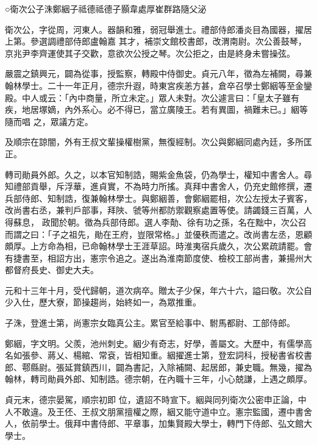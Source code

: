 
\begin{pinyinscope}

 ○衛次公子洙鄭絪子祗德祗德子顥韋處厚崔群路隨父泌



 衛次公，字從周，河東人。器韻和雅，弱冠舉進士。禮部侍郎潘炎目為國器，擢居上第。參選調禮部侍郎盧翰嘉
 其才，補崇文館校書郎，改渭南尉。次公善鼓琴，京兆尹李齊運使其子交歡，意欲次公授之琴。次公拒之，由是終身未嘗操弦。



 嚴震之鎮興元，闢為從事，授監察，轉殿中侍御史。貞元八年，徵為左補闕，尋兼翰林學士。二十一年正月，德宗升遐，時東宮疾恙方甚，倉卒召學士鄭絪等至金鑾殿。中人或云：「內中商量，所立未定。」眾人未對。次公遽言曰：「皇太子雖有疾，地居塚嫡，內外系心。必不得已，當立廣陵王。若有異圖，禍難未已。」絪等隨而唱
 之，眾議方定。



 及順宗在諒闇，外有王叔文輩操權樹黨，無復經制。次公與鄭絪同處內廷，多所匡正。



 轉司勛員外郎。久之，以本官知制誥，賜紫金魚袋，仍為學士，權知中書舍人。尋知禮部貢舉，斥浮華，進貞實，不為時力所搖。真拜中書舍人，仍充史館修撰，遷兵部侍郎、知制誥，復兼翰林學士。與鄭絪善，會鄭絪罷相，次公左授太子賓客，改尚書右丞，兼判戶部事，拜陜、虢等州都防禦觀察處置等使。請蠲錢三百萬，人得蘇息，
 政聞於朝。徵為兵部侍郎。選人李勣、徐有功之孫，名在黜中，次公召而謂之曰：「子之祖先，勛在王府，豈限常格。」並優秩而遣之。改尚書左丞，恩顧頗厚。上方命為相，已命翰林學士王涯草詔。時淮夷宿兵歲久，次公累疏請罷。會有捷書至，相詔方出，憲宗令追之。遂出為淮南節度使、檢校工部尚書，兼揚州大都督府長史、御史大夫。



 元和十三年十月，受代歸朝，道次病卒。贈太子少保，年六十六，謚曰敬。次公自少入仕，歷大寮，節操趨尚，始終如一，為眾推重。



 子洙，登進士第，尚憲宗女臨真公主。累官至給事中、駙馬都尉、工部侍郎。



 鄭絪，字文明。父羨，池州刺史。絪少有奇志，好學，善屬文。大歷中，有儒學高名如張參、蔣乂、楊綰、常袞，皆相知重。絪擢進士第，登宏詞科，授秘書省校書郎、鄠縣尉。張延賞鎮西川，闢為書記，入除補闕、起居郎，兼史職。無幾，擢為翰林，轉司勛員外郎、知制誥。德宗朝，在內職十三年，小心兢謙，上遇之頗厚。



 貞元末，德宗晏駕，順宗初即
 位，遺詔不時宣下。絪與同列衛次公密申正論，中人不敢違。及王伾、王叔文朋黨擅權之際，絪又能守道中立。憲宗監國，遷中書舍人，依前學士。俄拜中書侍郎、平章事，加集賢殿大學士，轉門下侍郎、弘文館大學士。




\end{pinyinscope}
